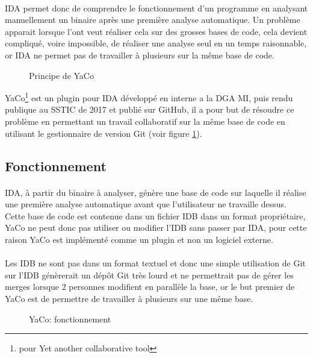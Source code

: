 \documentclass[11pt, book, english, french, standardlists]{upmethodology-document}
\begin{document}
				\paragraph*{}
					IDA permet donc de comprendre le fonctionnement d'un programme en analysant manuellement un binaire après une première analyse automatique. Un problème apparait lorsque l'ont veut réaliser cela sur des grosses bases de code, cela devient compliqué, voire impossible, de réaliser une analyse seul en un temps raisonnable, or IDA ne permet pas de travailler à plusieurs sur la même base de code.
				\begin{figure}[H]
					\centering
					\caption{Principe de YaCo}
					\label{fig:YaCo_principe}
				\end{figure}
					YaCo\footnote{pour Yet another collaborative tool} est un plugin pour IDA développé en interne a la \gls{DGA MI}, puis rendu publique au \gls{SSTIC} de 2017\cite{SSTICYaCo} et publié sur GitHub\cite{GithubYaCo}, il a pour but de résoudre ce problème en permettant un travail collaboratif sur la même base de code en utilisant le gestionnaire de version Git (voir figure \ref{fig:YaCo_principe}).
			\subsection{Fonctionnement}
				\paragraph*{}
					IDA, à partir du binaire à analyser, génère une base de code sur laquelle il réalise une première analyse automatique avant que l'utilisateur ne travaille dessus. Cette base de code est contenue dans un fichier \gls{IDB} dans un format propriétaire, YaCo ne peut donc pas utiliser ou modifier l'\gls{IDB} sans passer par IDA, pour cette raison YaCo est implémenté comme un plugin et non un logiciel externe.
				\paragraph*{}
					Les \gls{IDB} ne sont pas dans un format textuel et donc une simple utilisation de Git sur l'\gls{IDB} génèrerait un dépôt Git très lourd et ne permettrait pas de gérer les merges lorsque 2 personnes modifient en parallèle la base, or le but premier de YaCo est de permettre de travailler à plusieurs sur une même base.
				\begin{figure}[H]
					\centering
					\caption{YaCo: fonctionnement}
					\label{fig:YaCo_fonctionnement}
				\end{figure}
\end{document}
